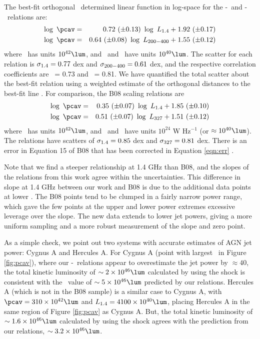 \documentclass{emulateapj}
\begin{document}
The best-fit orthogonal \bces\ determined linear function in log-space
for the \pcav-\phigh\ and \pcav-\plow\ relations are:
\begin{eqnarray}
  \log~\pcav &=& 0.72~(\pm 0.13)~\log~\phigh + 1.92~(\pm 0.17) \label{eqn:high}\\
  \log~\pcav &=& 0.64~(\pm 0.08)~\log~\plow + 1.55~(\pm 0.12) \label{eqn:low}
\end{eqnarray}
where \pcav\ has units $10^{42} \lum$, and \phigh\ and \plow\ have
units $10^{40} \lum$. The scatter for each relation is $\sigma_{\mathrm{1.4}} = 0.77$
dex and $\sigma_{\mathrm{200-400}} = 0.61$ dex, and the respective correlation
coefficients are \rhigh\ = 0.73 and \rlow\ = 0.81. We have quantified
the total scatter about the best-fit relation using a weighted
estimate of the orthogonal distances to the best-fit line
\citep[see][for equations]{2009A&A...498..361P}. For comparison, the
B08 scaling relations are
\begin{eqnarray}
  \log~\pcav &=& 0.35~(\pm 0.07)~\log~\phigh + 1.85~(\pm 0.10) \\
  \log~\pcav &=& 0.51~(\pm 0.07)~\log~\pthree + 1.51~(\pm 0.12) \label{eqn:err}
\end{eqnarray}
where \pcav\ has units $10^{42} \lum$, and \phigh\ and \pthree\ have
units $10^{24}$ W Hz$^{-1}$ (or $\approx 10^{40} \lum$). The relations
have scatters of $\sigma_{\mathrm{1.4}} = 0.85$ dex and $\sigma_{\mathrm{327}} = 0.81$ dex. There
is an error in Equation 15 of B08 that has been corrected in Equation
\ref{eqn:err} \citep{birzan08err}.

Note that we find a steeper relationship at 1.4 GHz than B08, and the
slopes of the relations from this work agree within the
uncertainties. This difference in slope at 1.4 GHz between our work
and B08 is due to the additional data points at lower \pjet. The B08
points tend to be clumped in a fairly narrow power range, which gave
the few points at the upper and lower power extremes excessive
leverage over the slope. The new data extends to lower jet powers,
giving a more uniform sampling and a more robust measurement of the
slope and zero point.

As a simple check, we point out two systems with accurate estimates of
AGN jet power: Cygnus A and Hercules A. For Cygnus A (point with
largest \prad\ in Figure \ref{fig:pcav}), where our
\pjet-\prad\ relations appear to overestimate the jet power by
$\approx 40$, the total kinetic luminosity of $\sim 2\times10^{46}
\lum$ calculated by \citet{2006ApJ...644L...9W} using the shock is
consistent with the \pjet\ value of $\sim 5\times10^{46} \lum$
predicted by our relations. Hercules A (which is not in the B08
sample) is a similar case to Cygnus A, with $\pcav = 310\times10^{42}
\lum$ and $\phigh = 4100\times10^{40} \lum$, placing Hercules A in the
same region of Figure \ref{fig:pcav} as Cygnus A. But, the total
kinetic luminosity of $\sim 1.6\times10^{46} \lum$ calculated by
\citet{herca} using the shock agrees with the prediction from our
relations, $\sim 3.2\times10^{46} \lum$.
\end{document}
